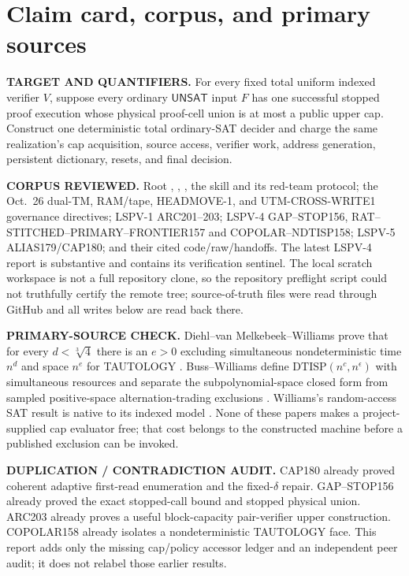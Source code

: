 \documentclass[11pt]{article}
\newcommand{\UNSAT}{\mathsf{UNSAT}}
\begin{document}
\section{Claim card, corpus, and primary sources}
\textbf{TARGET AND QUANTIFIERS.}  For every fixed total uniform indexed
verifier $V$, suppose every ordinary $\UNSAT$ input $F$ has one successful
stopped proof execution whose physical proof-cell union is at most a public
upper cap.  Construct one deterministic total ordinary-SAT decider and
charge the same realization's cap acquisition, source access, verifier work,
address generation, persistent dictionary, resets, and final decision.

\textbf{CORPUS REVIEWED.}  Root , ,
, the  skill and its red-team protocol;
the Oct.~26 dual-TM, RAM/tape, HEADMOVE-1, and UTM-CROSS-WRITE1 governance
directives; LSPV-1 ARC201--203; LSPV-4 GAP--STOP156,
RAT--STITCHED--PRIMARY--FRONTIER157 and COPOLAR--NDTISP158; LSPV-5
ALIAS179/CAP180; and their cited code/raw/handoffs.  The latest LSPV-4 report
is substantive and contains its verification sentinel.  The local scratch
workspace is not a full repository clone, so the repository preflight script
could not truthfully certify the remote tree; source-of-truth files were read
through GitHub and all writes below are read back there.

\textbf{PRIMARY-SOURCE CHECK.}  Diehl--van Melkebeek--Williams prove that for
every $d<\sqrt[3]{4}$ there is an $e>0$ excluding simultaneous
nondeterministic time $n^d$ and space $n^e$ for TAUTOLOGY \cite{dmw}.
Buss--Williams define $\mathrm{DTISP}(n^c,n^\epsilon)$ with simultaneous
resources and separate the subpolynomial-space closed form from sampled
positive-space alternation-trading exclusions \cite{bw}.  Williams's
random-access SAT result is native to its indexed model \cite{wil}.  None of
these papers makes a project-supplied cap evaluator free; that cost belongs
to the constructed machine before a published exclusion can be invoked.

\textbf{DUPLICATION / CONTRADICTION AUDIT.}  CAP180 already proved coherent
adaptive first-read enumeration and the fixed-$\delta$ repair.  GAP--STOP156
already proved the exact stopped-call bound and stopped physical union.
ARC203 already proves a useful block-capacity pair-verifier upper
construction.  COPOLAR158 already isolates a nondeterministic TAUTOLOGY
face.  This report adds only the missing cap/policy accessor ledger and an
independent peer audit; it does not relabel those earlier results.
\end{document}
